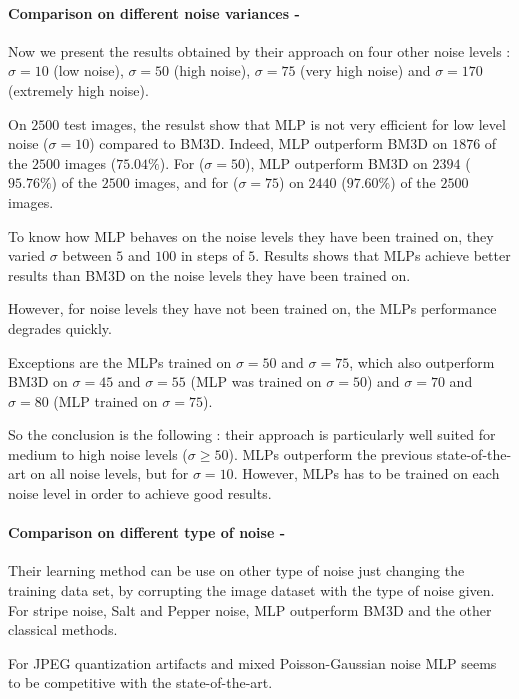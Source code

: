 \documentclass[10pt,a4paper]{article}
\newcommand{\svs}{\vspace{9pt}}
\newcommand{\ourparagraph}[1]{\paragraph{#1}}
\begin{document}
\ourparagraph{Comparison on different noise variances -}{
Now we present the results obtained by their approach on four other
noise levels : $\sigma = 10$ (low noise), $\sigma = 50$
(high noise), $\sigma = 75$ (very high noise) and $\sigma = 170$ (extremely high noise). 

\svs

On $2500$ test images, the resulst show that MLP is not very efficient for low level noise ($\sigma=10$) compared to BM3D. Indeed, MLP outperform BM3D on $1876$ of the $2500$ images ($75.04\%$).
For ($\sigma = 50$), MLP outperform BM3D on $2394$ ($95.76 \%$) of the $2500$ images, and for ($\sigma = 75$) on $2440$ ($97.60\%$) of the $2500$ images.

\svs 

To know how MLP behaves on the noise levels they have been trained on, they varied $\sigma$ between $5$ and $100$ in steps of $5$.
Results shows that MLPs achieve better results than BM3D on the noise levels they have been trained on.

\svs
However, for noise levels they have not been
trained on, the MLPs performance degrades quickly.

Exceptions are the MLPs trained on $\sigma = 50$ and $\sigma = 75$, which also outperform BM3D on $\sigma = 45$ and $\sigma = 55$ (MLP was trained on $\sigma = 50$) and $\sigma = 70$ and $\sigma = 80$ (MLP trained on $\sigma = 75$).

\svs

So the conclusion is the following : their approach is particularly well suited for medium to high noise
levels ($\sigma \geq 50$). MLPs outperform the previous state-of-the-art on all noise levels, but for $\sigma = 10$. However, MLPs has to be trained on each noise level in order to achieve good results.}

\svs

\ourparagraph{Comparison on different type of noise -}{


Their learning method can be use on other type of noise just changing the training data set, by corrupting the image dataset with the type of noise given. For stripe noise, Salt and Pepper noise, MLP outperform BM3D and the other classical methods.

For JPEG quantization artifacts and mixed Poisson-Gaussian noise MLP seems to be competitive with the state-of-the-art.}
\end{document}
